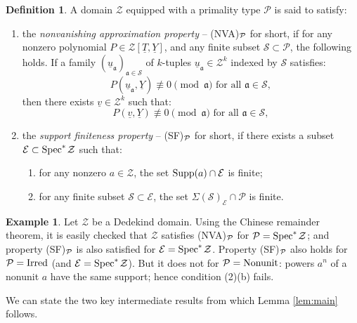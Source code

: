 \documentclass[11pt,a4paper,reqno]{amsart}
\theoremstyle{definition}
\newtheorem{defn}[thm]{Definition}
\newtheorem{exa}[thm]{Example}
\begin{document}
\begin{defn}\label{def:schproide}
A domain $\mathcal{Z}$ equipped with a primality type $\mathcal{P}$ is said to satisfy:

\begin{enumerate}
\item \label{eq:nonvanpr} the \emph{nonvanishing approximation property} -- (NVA)$\null_{\mathcal P}$ for short, if for any nonzero polynomial $P \in \mathcal{Z}[\underline{T},\underline{Y}]$, and any finite subset $\mathcal{S} \subset \mathcal{P}$, the following holds. If a family $(\underline{u}_{\mathfrak{a}})_{\mathfrak{a} \in \mathcal{S}}$ of $k$-tuples $\underline{u}_{\mathfrak{a}} \in \mathcal{Z}^k$ indexed by $\mathcal{S}$ satisfies: 
$$
P(\underline{u}_{\mathfrak{a}},\underline{Y}) \not \equiv 0 \pmod{\mathfrak{a}}\,\,\text{for all}\,\, \mathfrak{a} \in \mathcal{S},
$$
then there exists $\underline{v} \in \mathcal{Z}^k$ such that:
$$
P(\underline{v},\underline{Y}) \not \equiv 0 \pmod{\mathfrak{a}}\,\,\text{for all}\,\, \mathfrak{a} \in \mathcal{S},
$$
\item the \emph{support finiteness property} -- (SF)$\null_{\mathcal P}$ for short, if  there exists a subset $\mathcal{E} \subset {\rm Spec}^\ast\hskip 1pt \mathcal{Z}$ such that:\label{eq:exismaide}
\begin{enumerate}
\item for any nonzero $a \in \mathcal{Z}$, the set $
{\rm Supp}(a) \cap \mathcal{E}
$ is finite;
\item for any finite subset $\mathcal{S} \subset \mathcal{E}$, the set $
\Sigma(\mathcal{S})_{\mathcal{E}} \cap \mathcal{P}$
is finite.
\end{enumerate}
\end{enumerate}
\end{defn}
\begin{exa}\label{exa:dednvasf}
Let $\mathcal{Z}$ be a Dedekind domain. Using the Chinese remainder theorem, it is easily  checked that $\mathcal{Z}$ satisfies (NVA)$\null_{\mathcal P}$ for ${\mathcal P} = {\rm Spec}^\ast\hskip 1pt \mathcal{Z}$; and property 
(SF)$\null_{\mathcal P}$ is also satisfied  for $\mathcal{E}={\rm Spec}^\ast\hskip 1pt \mathcal{Z}$. Property 
(SF)$\null_{\mathcal P}$ also holds for ${\mathcal P}= {\rm Irred}$ (and $\mathcal{E}={\rm Spec}^\ast\hskip 1pt \mathcal{Z}$). But it does not for ${\mathcal P}= {\rm Nonunit}$: powers $a^n$ of a nonunit $a$ have the same support; hence condition (2)(b) fails.
\end{exa}
We can state the two key intermediate results from which Lemma \ref{lem:main} follows.
\end{document}
